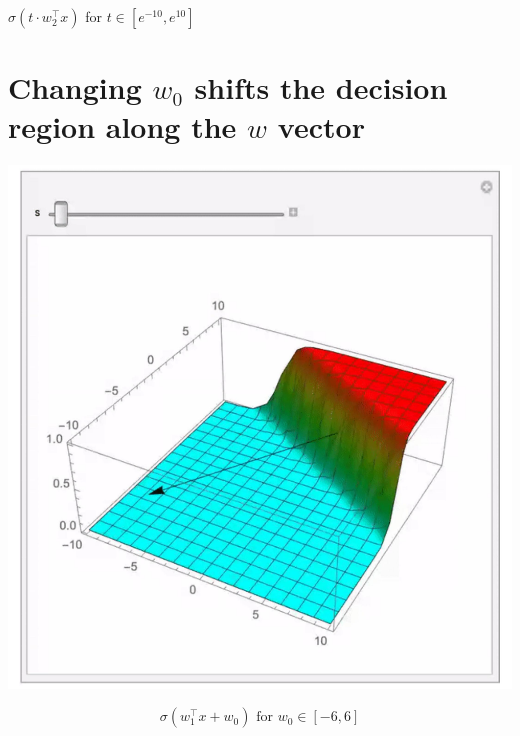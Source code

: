 \documentclass[10pt]{article}
\begin{document}
$\sigma\left(t \cdot w_{2}^{\top} x\right)$ for $t \in\left[e^{-10}, e^{10}\right]$

\section*{Changing $w_{0}$ shifts the decision region along the $w$ vector}
\begin{center}
\includegraphics[max width=\textwidth]{2023_12_30_261a5c67f471a6c49904g-11(1)}
\end{center}

$$
\sigma\left(w_{1}^{\top} x+w_{0}\right) \text { for } w_{0} \in[-6,6]
$$
\end{document}
